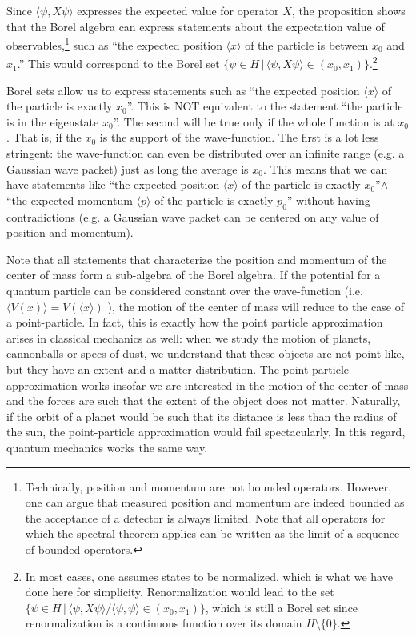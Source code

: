 \documentclass[11pt, executivepaper]{article}
\begin{document}
Since $\langle \psi , X \psi \rangle$ expresses the expected value for operator $X$, the proposition shows that the Borel algebra can express statements about the expectation value of observables,\footnote{Technically, position and momentum are not bounded operators. However, one can argue that measured position and momentum are indeed bounded as the acceptance of a detector is always limited. Note that all operators for which the spectral theorem applies can be written as the limit of a sequence of bounded operators.} such as ``the expected position $\langle x \rangle$ of the particle is between $x_0$ and $x_1$.'' This would correspond to the Borel set $\{ \psi \in H \, | \, \langle \psi , X \psi \rangle \in (x_0, x_1) \}$.\footnote{In most cases, one assumes states to be normalized, which is what we have done here for simplicity. Renormalization would lead to the set $\{ \psi \in H \, | \, \langle \psi , X \psi \rangle / \langle \psi , \psi \rangle \in (x_0, x_1) \}$, which is still a Borel set since renormalization is a continuous function over its domain $H \setminus \{ 0 \}$.}

Borel sets allow us to express statements such as ``the expected position $\langle x \rangle$ of the particle is exactly $x_0$''. This is NOT equivalent to the statement ``the particle is in the eigenstate $x_0$''. The second will be true only if the whole function is at $x_0$. That is, if the $x_0$ is the support of the wave-function. The first is a lot less stringent: the wave-function can even be distributed over an infinite range (e.g. a Gaussian wave packet) just as long the average is $x_0$. This means that we can have statements like ``the expected position $\langle x \rangle$ of the particle is exactly $x_0$''$\wedge$ ``the expected momentum $\langle p \rangle$ of the particle is exactly $p_0$'' without having contradictions (e.g. a Gaussian wave packet can be centered on any value of position and momentum).

Note that all statements that characterize the position and momentum of the center of mass form a sub-algebra of the Borel algebra. If the potential for a quantum particle can be considered constant over the wave-function (i.e. $\langle V(x) \rangle = V(\langle x \rangle)$ ), the motion of the center of mass will reduce to the case of a point-particle. In fact, this is exactly how the point particle approximation arises in classical mechanics as well: when we study the motion of planets, cannonballs or specs of dust, we understand that these objects are not point-like, but they have an extent and a matter distribution. The point-particle approximation works insofar we are interested in the motion of the center of mass and the forces are such that the extent of the object does not matter. Naturally, if the orbit of a planet would be such that its distance is less than the radius of the sun, the point-particle approximation would fail spectacularly. In this regard, quantum mechanics works the same way.
\end{document}
